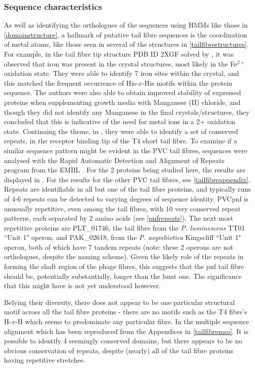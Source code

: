 \subsubsection{Sequence characteristics}
As well as identifying the orthologues of the sequences using HMMs like those in \vref{domainstructure}, a hallmark of putative tail fibre sequences is the coordination of metal atoms, like those seen in several of the structures in \vref{tailfibrestructures}. For example, in the tail fibre tip structure PDB ID 2XGF solved by \cite{Bartual2010}, it was observed that iron was present in the crystal structures, most likely in the Fe$^{2+}$ oxidation state. They were able to identify 7 iron sites within the crystal, and this matched the frequent occurrence of His-$x$-His motifs within the protein sequence. The authors were also able to obtain improved stability of expressed proteins when supplementing growth media with Manganese (II) chloride, and though they did not identify any Manganese in the final crystals/structures, they concluded that this is indicative of the need for metal ions in a 2+ oxidation state. Continuing the theme, in \cite{VanRaaij2001}, they were able to identify a set of conserved repeats, in the receptor binding tip of the T4 short tail fibre. To examine if a similar sequence pattern might be evident in the PVC tail fibres, sequences were analysed with the Rapid Automatic Detection and Alignment of Repeats program from the EMBL \citep{Heger2000}. For the 2 proteins being studied here, the results are displayed in . For the results for the other PVC tail fibres, see \vref{tailfibreappendix}. Repeats are identifiable in all but one of the tail fibre proteins, and typically runs of 4-6 repeats can be detected to varying degrees of sequence identity. PVCpnf is unusually repetitive, even among the tail fibres, with 10 very conserved repeat patterns, each separated by 2 amino acids (see \vref{pnfrepeats}). The next most repetitive proteins are PLT\_01746, the tail fibre from the \emph{P. luminescens} TT01 ``Unit 1" operon, and PAK\_02618, from the \emph{P. asymbiotica} Kingscliff ``Unit 1" operon, both of which have 7 tandem repeats (note: these 2 operons are not orthologues, despite the naming scheme). Given the likely role of the repeats in forming the shaft region of the phage fibres, this suggests that the pnf tail fibre should be, potentially substantially, longer than the lumt one. The significance that this might have is not yet understood however.

Belying their diversity, there does not appear to be one particular structural motif across all the tail fibre proteins - there are no motifs such as the T4 fibre's H-$x$-H which seems to predominate any particular fibre. In the multiple sequence alignment which has been reproduced from the Appendices in \vref{tailfibremsa}. It is possible to identify 4 seemingly conserved domains, but there appears to be no obvious conservation of repeats, despite (nearly) all of the tail fibre proteins having repetitive stretches. 

